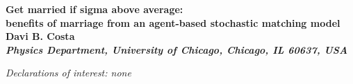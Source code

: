 \documentclass[12pt]{article}
\begin{document}
\baselineskip=18pt \pagestyle{plain} \setcounter{page}{1}


\begin{center}

{\Large \bf  Get married if sigma above average:\\ benefits of marriage from an agent-based stochastic matching model} \\ [9mm]



{\normalsize \bf Davi B. Costa \\ [3mm]
{\small \it Physics Department, University of Chicago, Chicago, IL 60637, USA}}


\end{center}

\vspace*{0.2cm}


\vspace{50mm}
\centering\textit{Declarations of interest: none}
\end{document}
